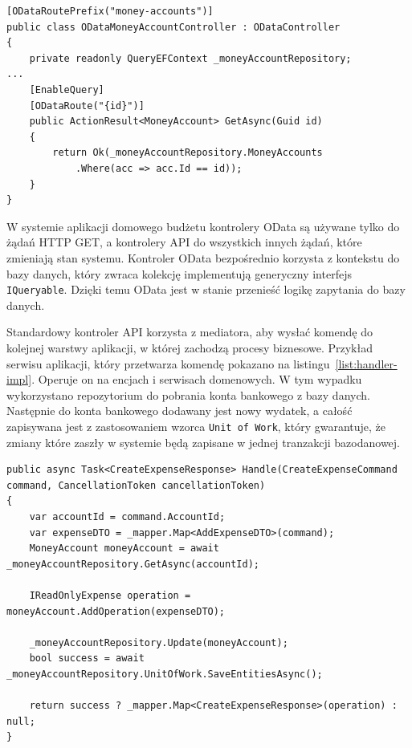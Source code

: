 {\belowcaptionskip=-10pt
\begin{lstlisting}[label=list:odata-ctrl-1,
    caption=Przykład implementacji kontrolera OData]
[ODataRoutePrefix("money-accounts")]
public class ODataMoneyAccountController : ODataController
{
    private readonly QueryEFContext _moneyAccountRepository;
...
    [EnableQuery]
    [ODataRoute("{id}")]
    public ActionResult<MoneyAccount> GetAsync(Guid id)
    {
        return Ok(_moneyAccountRepository.MoneyAccounts
            .Where(acc => acc.Id == id));
    }
}
\end{lstlisting}
}

W systemie aplikacji domowego budżetu kontrolery OData są używane tylko do żądań HTTP GET, a kontrolery API do wszystkich innych żądań, które zmieniają stan systemu.
Kontroler OData bezpośrednio korzysta z kontekstu do bazy danych, który zwraca kolekcję implementują generyczny interfejs \texttt{IQueryable}. Dzięki temu OData jest w stanie przenieść logikę zapytania do bazy danych.

Standardowy kontroler API korzysta z mediatora, aby wysłać komendę do kolejnej warstwy aplikacji, w której zachodzą procesy biznesowe. Przykład serwisu aplikacji, który przetwarza komendę pokazano na listingu~\ref{list:handler-impl}. Operuje on na encjach i serwisach domenowych. W tym wypadku wykorzystano repozytorium do pobrania konta bankowego z bazy danych. Następnie do konta bankowego dodawany jest nowy wydatek, a całość zapisywana jest z zastosowaniem wzorca \texttt{Unit of Work}, który gwarantuje, że zmiany które zaszły w systemie będą zapisane w jednej tranzakcji bazodanowej. 

{\belowcaptionskip=-10pt
\begin{lstlisting}[label=list:handler-impl,
    caption=Przykład implementacji handlera aplikacji]
public async Task<CreateExpenseResponse> Handle(CreateExpenseCommand command, CancellationToken cancellationToken)
{
    var accountId = command.AccountId;
    var expenseDTO = _mapper.Map<AddExpenseDTO>(command);
    MoneyAccount moneyAccount = await _moneyAccountRepository.GetAsync(accountId);

    IReadOnlyExpense operation = moneyAccount.AddOperation(expenseDTO);

    _moneyAccountRepository.Update(moneyAccount);
    bool success = await _moneyAccountRepository.UnitOfWork.SaveEntitiesAsync();

    return success ? _mapper.Map<CreateExpenseResponse>(operation) : null;
}
\end{lstlisting}
}

